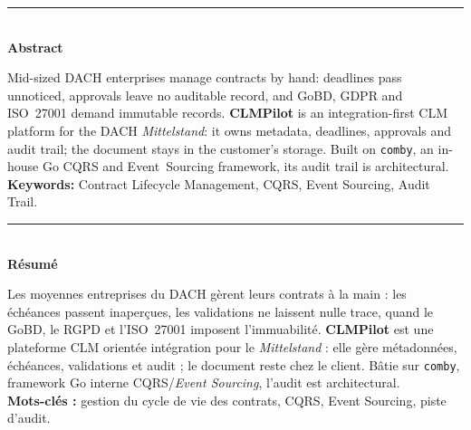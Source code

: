 \begingroup
\setlength{\parindent}{0pt}
\singlespacing
\newcommand{\bcbodysize}{\fontsize{12}{14.5}\selectfont}
\vspace*{-\dimexpr\headheight+\headsep\relax}
\noindent\begin{minipage}[t][\dimexpr\textheight+\headheight+\headsep-4\baselineskip\relax][s]{\textwidth}

\rule{\textwidth}{1pt}\\[0.3cm]
\textbf{Abstract}\\[0.25cm]
{\bcbodysize
Mid-sized DACH enterprises manage contracts by hand: deadlines pass unnoticed,
approvals leave no auditable record, and GoBD, GDPR and ISO~27001 demand
immutable records. \textbf{CLMPilot} is an integration-first CLM platform for
the DACH \textit{Mittelstand}: it owns metadata, deadlines, approvals and audit
trail; the document stays in the customer's storage.
Built on \texttt{comby}, an in-house Go CQRS and Event~Sourcing framework, its
audit trail is architectural.
\\[0.25cm]
\textbf{Keywords:} Contract Lifecycle Management, CQRS, Event Sourcing,
Audit Trail.\par}

\vfill

\rule{\textwidth}{1pt}\\[0.3cm]
\textbf{Résumé}\\[0.25cm]
{\bcbodysize
Les moyennes entreprises du DACH gèrent leurs contrats à la main : les échéances
passent inaperçues, les validations ne laissent nulle trace, quand le GoBD, le
RGPD et l'ISO~27001 imposent l'immuabilité. \textbf{CLMPilot} est
une plateforme CLM orientée intégration pour le \textit{Mittelstand} : elle
gère métadonnées, échéances, validations et audit ; le document reste chez le
client. Bâtie sur \texttt{comby}, framework Go interne CQRS/\textit{Event
Sourcing}, l'audit est architectural.
\\[0.25cm]
\textbf{Mots-clés :} gestion du cycle de vie des contrats, CQRS, Event
Sourcing, piste d'audit.\par}


\end{minipage}
